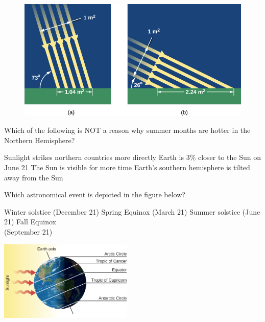 \documentclass[addpoints]{exam}
\begin{document}
\begin{questions}
\begin{figure}[h!]
    \centering
    \includegraphics{Figures/Figure4.6.jpg}
\end{figure}

\clearpage

\question
Which of the following is NOT a reason why summer months are hotter in the Northern Hemisphere?

\begin{choices}
    \choice Sunlight strikes northern countries more directly
    \correctchoice Earth is 3\% closer to the Sun on June 21
    \choice The Sun is visible for more time
    \choice Earth's southern hemisphere is tilted away from the Sun
\end{choices}

\question
Which astronomical event is depicted in the figure below?

\begin{minipage}{0.45\textwidth}
    \centering
    \begin{choices}
    \choice Winter solstice (December 21)
    \choice Spring Equinox (March 21)
    \correctchoice Summer solstice (June 21)
    \choice Fall Equinox\\ (September 21)
    \end{choices}
\end{minipage}%
\begin{minipage}{0.5\textwidth}
    \centering
    \includegraphics[width=2.5in]{Figures/Figure4.8.jpg}
\end{minipage}
\vspace{1em}


\end{questions}
\end{document}
